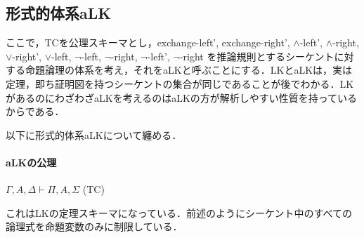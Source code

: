 \documentclass{ltjsarticle}
\theoremstyle{mystyle1}
\theoremstyle{mystyle2}
\begin{document}
\subsection{形式的体系aLK}
ここで，TCを公理スキーマとし，exchange-left', exchange-right', $\wedge$-left', $\wedge$-right, $\vee$-right', $\vee$-left, $\neg$-left, $\neg$-right, $\neg$-left', $\neg$-right を推論規則とするシーケントに対する命題論理の体系を考え，それをaLKと呼ぶことにする．LKとaLKは，実は定理，即ち証明図を持つシーケントの集合が同じであることが後でわかる．LKがあるのにわざわざaLKを考えるのはaLKの方が解析しやすい性質を持っているからである．

以下に形式的体系aLKについて纏める．
\paragraph{aLKの公理}
$\Gamma,A,\Delta\vdash\Pi,A,\Sigma$ (TC)

これはLKの定理スキーマになっている．前述のようにシーケント中のすべての論理式を命題変数のみに制限している．
\end{document}
